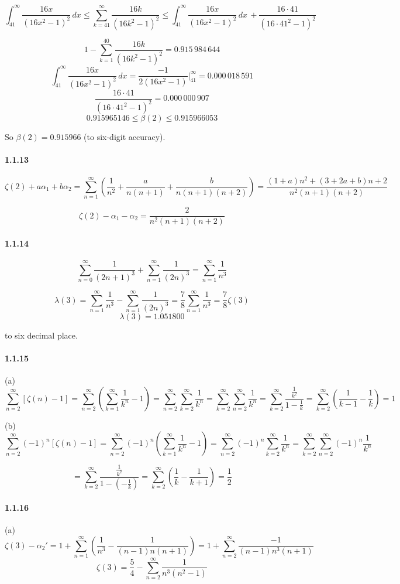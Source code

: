\documentclass[a4paper]{article}
\begin{document}
\[\int_{41}^\infty\frac{16x}{(16x^2-1)^2}\,dx\leq\sum_{k=41}^\infty\frac{16k}{(16k^2-1)^2}\leq\int_{41}^\infty\frac{16x}{(16x^2-1)^2}\,dx\,+\frac{16\cdot 41}{(16\cdot 41^2-1)^2}\]

\[1-\sum_{k=1}^{40}\frac{16k}{(16k^2-1)^2}=0.915\,984\,644\]
\[\int_{41}^\infty\frac{16x}{(16x^2-1)^2}\,dx=\frac{-1}{2(16x^2-1)}\Big|_{41}^\infty=0.000\,018\,591\]
\[\frac{16\cdot 41}{(16\cdot 41^2-1)^2}=0.000\,000\,907\]
\[0.915965146\leq\beta(2)\leq0.915966053\]

So $\beta(2)=0.915966$ (to six-digit accuracy).

\paragraph{1.1.13}
\[\zeta(2)+a\alpha_1+b\alpha_2=\sum_{n=1}^\infty(\frac{1}{n^2}+\frac{a}{n(n+1)}+\frac{b}{n(n+1)(n+2)})=\frac{(1+a)n^2+(3+2a+b)n+2}{n^2(n+1)(n+2)}\]

\[\zeta(2)-\alpha_1-\alpha_2=\frac{2}{n^2(n+1)(n+2)}\]

\paragraph{1.1.14}
\[\sum_{n=0}^\infty \frac{1}{(2n+1)^3}+\sum_{n=1}^\infty\frac{1}{(2n)^3}=\sum_{n=1}^\infty\frac{1}{n^3}\]

\[\lambda(3)=\sum_{n=1}^\infty\frac{1}{n^3}-\sum_{n=1}^\infty\frac{1}{(2n)^3}=\frac{7}{8}\sum_{n=1}^\infty\frac{1}{n^3}=\frac{7}{8}\zeta(3)\]
\[\lambda(3)=1.051800\]

to six decimal place.

\paragraph{1.1.15}
(a) \[\sum_{n=2}^\infty[\zeta(n)-1]=\sum_{n=2}^\infty(\sum_{k=1}^\infty\frac{1}{k^n}-1)=\sum_{n=2}^\infty\sum_{k=2}^\infty\frac{1}{k^n}=\sum_{k=2}^\infty\sum_{n=2}^\infty\frac{1}{k^n}=\sum_{k=2}^\infty\frac{\frac{1}{k^2}}{1-\frac{1}{k}}=\sum_{k=2}^\infty(\frac{1}{k-1}-\frac{1}{k})=1\]

(b) \[\sum_{n=2}^\infty(-1)^n[\zeta(n)-1]=\sum_{n=2}^\infty(-1)^n(\sum_{k=1}^\infty\frac{1}{k^n}-1)=\sum_{n=2}^\infty(-1)^n\sum_{k=2}^\infty\frac{1}{k^n}=\sum_{k=2}^\infty\sum_{n=2}^\infty(-1)^n\frac{1}{k^n}\]

\[=\sum_{k=2}^\infty\frac{\frac{1}{k^2}}{1-(-\frac{1}{k})}=\sum_{k=2}^\infty(\frac{1}{k}-\frac{1}{k+1})=\frac{1}{2}\]

\paragraph{1.1.16}
(a) \[\zeta(3)-\alpha_2'=1+\sum_{n=1}^\infty(\frac{1}{n^3}-\frac{1}{(n-1)n(n+1)})=1+\sum_{n=2}^\infty\frac{-1}{(n-1)n^3(n+1)}\]
\[\zeta(3)=\frac{5}{4}-\sum_{n=2}^\infty\frac{1}{n^3(n^2-1)}\]
\end{document}

